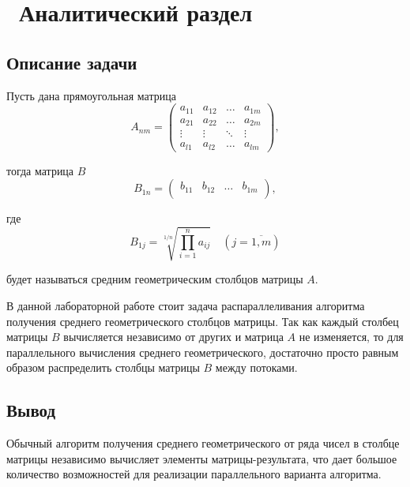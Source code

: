 \chapter{ Аналитический раздел}
    \label{cha:analytical}
    \section{Описание задачи}
    Пусть дана прямоугольная матрица
    \begin{equation}
    A_{nm} = \begin{pmatrix}
    a_{11} & a_{12} & \ldots & a_{1m}\\
    a_{21} & a_{22} & \ldots & a_{2m}\\
    \vdots & \vdots & \ddots & \vdots\\
    a_{l1} & a_{l2} & \ldots & a_{lm}
    \end{pmatrix},
    \end{equation}
    
    тогда матрица $B$
    \begin{equation}
    B_{1n} = \begin{pmatrix}
    b_{11} & b_{12} & \ldots & b_{1m}\\
    \end{pmatrix},
    \end{equation}
    
    где
    \begin{equation}
    \label{eq:M}
    B_{1j} = \sqrt[1/n]{\prod_{i=1}^{n} a_{ij}}\quad (j=\overline{1,m})
    \end{equation}
    
    будет называться средним геометрическим столбцов матрицы $A$.
    
    
    В данной лабораторной работе стоит задача распараллеливания алгоритма получения среднего геометрического столбцов матрицы. Так как каждый столбец матрицы $B$ вычисляется независимо от других и матрица $A$ не изменяется, то для параллельного вычисления среднего геометрического, достаточно просто равным образом распределить столбцы матрицы $B$ между потоками.
    
    
    
    \section{Вывод}
    	Обычный алгоритм получения среднего геометрического от ряда чисел в столбце матрицы независимо вычисляет элементы матрицы-результата, что дает большое количество возможностей для реализации параллельного варианта алгоритма.

\newpage